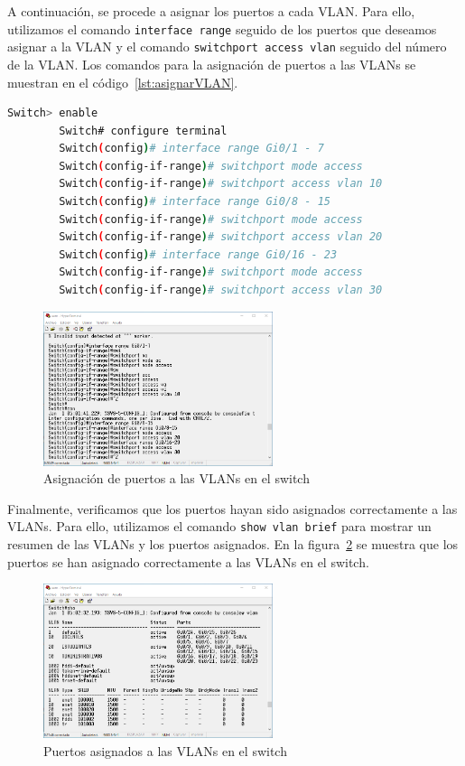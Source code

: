     A continuación, se procede a asignar los puertos a cada VLAN. Para ello, utilizamos el comando \texttt{interface range} seguido de los puertos que deseamos asignar a la VLAN y el comando \texttt{switchport access vlan} seguido del número de la VLAN. Los comandos para la asignación de puertos a las VLANs se muestran en el código~\ref{lst:asignarVLAN}.

    \begin{lstlisting}[language=bash, caption={Asignación de puertos a las VLANs en el switch}, label={lst:asignarVLAN}]
        Switch> enable
        Switch# configure terminal
        Switch(config)# interface range Gi0/1 - 7
        Switch(config-if-range)# switchport mode access
        Switch(config-if-range)# switchport access vlan 10
        Switch(config)# interface range Gi0/8 - 15
        Switch(config-if-range)# switchport mode access
        Switch(config-if-range)# switchport access vlan 20
        Switch(config)# interface range Gi0/16 - 23
        Switch(config-if-range)# switchport mode access
        Switch(config-if-range)# switchport access vlan 30
    \end{lstlisting}

    \begin{figure}[H]
        \centering
        \includegraphics[width=0.6\textwidth]{img/agregar_puertos_VLAN.png}
        \caption{Asignación de puertos a las VLANs en el switch}
        \label{fig:agregar_puertos_VLAN}
    \end{figure}

    Finalmente, verificamos que los puertos hayan  sido asignados correctamente a las VLANs. Para ello, utilizamos el comando \texttt{show vlan brief} para mostrar un resumen de las VLANs y los puertos asignados. En la figura~\ref{fig:puertos_asignados} se muestra que los puertos se han asignado correctamente a las VLANs en el switch.

    \begin{figure}[H]
        \centering
        \includegraphics[width=0.6\textwidth]{img/puertos_asignados.png}
        \caption{Puertos asignados a las VLANs en el switch}
        \label{fig:puertos_asignados}
    \end{figure}

